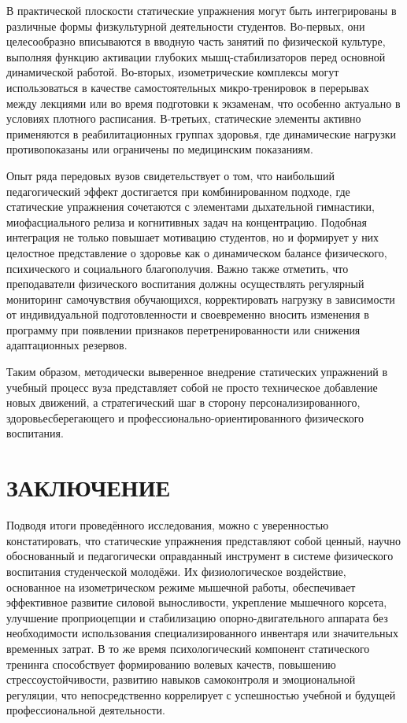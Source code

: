 \documentclass[oneside,a4paper,14pt]{extarticle}
\begin{document}
В практической плоскости статические упражнения могут быть интегрированы в различные формы физкультурной деятельности студентов. Во-первых, они целесообразно вписываются в вводную часть занятий по физической культуре, выполняя функцию активации глубоких мышц-стабилизаторов перед основной динамической работой. Во-вторых, изометрические комплексы могут использоваться в качестве самостоятельных микро-тренировок в перерывах между лекциями или во время подготовки к экзаменам, что особенно актуально в условиях плотного расписания. В-третьих, статические элементы активно применяются в реабилитационных группах здоровья, где динамические нагрузки противопоказаны или ограничены по медицинским показаниям.

Опыт ряда передовых вузов свидетельствует о том, что наибольший педагогический эффект достигается при комбинированном подходе, где статические упражнения сочетаются с элементами дыхательной гимнастики, миофасциального релиза и когнитивных задач на концентрацию. Подобная интеграция не только повышает мотивацию студентов, но и формирует у них целостное представление о здоровье как о динамическом балансе физического, психического и социального благополучия. Важно также отметить, что преподаватели физического воспитания должны осуществлять регулярный мониторинг самочувствия обучающихся, корректировать нагрузку в зависимости от индивидуальной подготовленности и своевременно вносить изменения в программу при появлении признаков перетренированности или снижения адаптационных резервов.

Таким образом, методически выверенное внедрение статических упражнений в учебный процесс вуза представляет собой не просто техническое добавление новых движений, а стратегический шаг в сторону персонализированного, здоровьесберегающего и профессионально-ориентированного физического воспитания.

\section*{ЗАКЛЮЧЕНИЕ}

Подводя итоги проведённого исследования, можно с уверенностью констатировать, что статические упражнения представляют собой ценный, научно обоснованный и педагогически оправданный инструмент в системе физического воспитания студенческой молодёжи. Их физиологическое воздействие, основанное на изометрическом режиме мышечной работы, обеспечивает эффективное развитие силовой выносливости, укрепление мышечного корсета, улучшение проприоцепции и стабилизацию опорно-двигательного аппарата без необходимости использования специализированного инвентаря или значительных временных затрат. В то же время психологический компонент статического тренинга способствует формированию волевых качеств, повышению стрессоустойчивости, развитию навыков самоконтроля и эмоциональной регуляции, что непосредственно коррелирует с успешностью учебной и будущей профессиональной деятельности.
\end{document}
